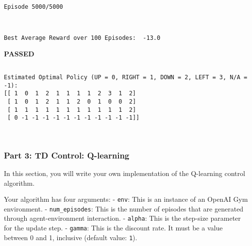 \documentclass[11pt]{article}
\begin{document}
    \begin{Verbatim}[commandchars=\\\{\}]
Episode 5000/5000
    \end{Verbatim}

    \begin{center}
    \end{center}
    { \hspace*{\fill} \\}
    
    \begin{Verbatim}[commandchars=\\\{\}]
Best Average Reward over 100 Episodes:  -13.0

    \end{Verbatim}

    \textbf{{PASSED}}

    
    \begin{Verbatim}[commandchars=\\\{\}]

Estimated Optimal Policy (UP = 0, RIGHT = 1, DOWN = 2, LEFT = 3, N/A = -1):
[[ 1  0  1  2  1  1  1  1  2  3  1  2]
 [ 1  0  1  2  1  1  2  0  1  0  0  2]
 [ 1  1  1  1  1  1  1  1  1  1  1  2]
 [ 0 -1 -1 -1 -1 -1 -1 -1 -1 -1 -1 -1]]

    \end{Verbatim}

    \begin{center}
    \end{center}
    { \hspace*{\fill} \\}
    
    \hypertarget{part-3-td-control-q-learning}{%
\subsubsection{Part 3: TD Control:
Q-learning}\label{part-3-td-control-q-learning}}

In this section, you will write your own implementation of the
Q-learning control algorithm.

Your algorithm has four arguments: - \texttt{env}: This is an instance
of an OpenAI Gym environment. - \texttt{num\_episodes}: This is the
number of episodes that are generated through agent-environment
interaction. - \texttt{alpha}: This is the step-size parameter for the
update step. - \texttt{gamma}: This is the discount rate. It must be a
value between 0 and 1, inclusive (default value: \texttt{1}).
\end{document}
